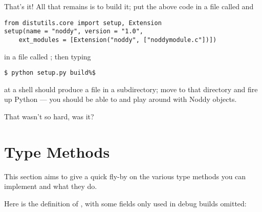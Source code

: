 That's it!  All that remains is to build it; put the above code in a
file called  and

\begin{verbatim}
from distutils.core import setup, Extension
setup(name = "noddy", version = "1.0",
    ext_modules = [Extension("noddy", ["noddymodule.c"])])
\end{verbatim}

in a file called ; then typing

\begin{verbatim}
$ python setup.py build%$
\end{verbatim}

at a shell should produce a file  in a subdirectory;
move to that directory and fire up Python --- you should be able to
 and play around with Noddy objects.

That wasn't so hard, was it?


\section{Type Methods
         \label{dnt-type-methods}}

This section aims to give a quick fly-by on the various type methods
you can implement and what they do.

Here is the definition of , with some fields only
used in debug builds omitted:

